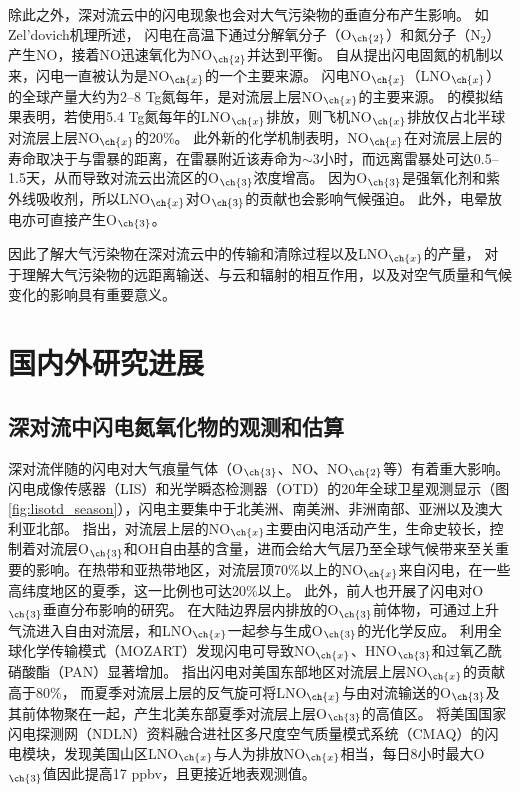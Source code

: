 除此之外，深对流云中的闪电现象也会对大气污染物的垂直分布产生影响。
如Zel'dovich机理所述\citep{Zeldovich.1967}，
闪电在高温下通过分解氧分子（O$_{\ch{2}}$）和氮分子（N$_2$）产生NO，接着NO迅速氧化为NO$_{\ch{2}}$并达到平衡。
自从\citet{Liebig.1827}提出闪电固氮的机制以来，闪电一直被认为是NO$_{\ch{x}}$的一个主要来源\citep{Hutchinson.1954}。
闪电NO$_{\ch{x}}$（LNO$_{\ch{x}}$）的全球产量大约为2–8 Tg氮每年，是对流层上层NO$_{\ch{x}}$的主要来源\citep{Galloway.2004,Schumann.2007}。
\citet{Grewe.2002}的模拟结果表明，若使用5.4 Tg氮每年的LNO$_{\ch{x}}$排放，则飞机NO$_{\ch{x}}$排放仅占北半球对流层上层NO$_{\ch{x}}$的20\%。
此外新的化学机制表明，NO$_{\ch{x}}$在对流层上层的寿命取决于与雷暴的距离，在雷暴附近该寿命为$\sim$3小时，而远离雷暴处可达0.5--1.5天\citep{Nault.2016,Nault.2017}，从而导致对流云出流区的O$_{\ch{3}}$浓度增高\citep{Pickering.1996,Hauglustaine.2001,DeCaria.2005}。
因为O$_{\ch{3}}$是强氧化剂和紫外线吸收剂\citep{Myhre.2013}，所以LNO$_{\ch{x}}$对O$_{\ch{3}}$的贡献也会影响气候强迫。
此外，电晕放电亦可直接产生O$_{\ch{3}}$\citep{Minschwaner.2008,Kotsakis.2017}。

因此了解大气污染物在深对流云中的传输和清除过程以及LNO$_{\ch{x}}$的产量，
对于理解大气污染物的远距离输送、与云和辐射的相互作用，以及对空气质量和气候变化的影响具有重要意义。



\section{国内外研究进展}

\subsection{深对流中闪电氮氧化物的观测和估算} \label{sec:intro_lnox}

深对流伴随的闪电对大气痕量气体（O$_{\ch{3}}$、NO、NO$_{\ch{2}}$等）有着重大影响\citep{DeCaria.2005,Schumann.2007,Ott.2010,Banerjee.2014}。
闪电成像传感器（LIS）和光学瞬态检测器（OTD）的20年全球卫星观测显示（图\ref{fig:lisotd_season}），闪电主要集中于北美洲、南美洲、非洲南部、亚洲以及澳大利亚北部。
\citet{Levy.1996}指出，对流层上层的NO$_{\ch{x}}$主要由闪电活动产生，生命史较长，控制着对流层O$_{\ch{3}}$和OH自由基的含量，进而会给大气层乃至全球气候带来至关重要的影响。在热带和亚热带地区，对流层顶70\%以上的NO$_{\ch{x}}$来自闪电，在一些高纬度地区的夏季，这一比例也可达20\%以上\citep{Jourdain.2001,Martin.2002}。
此外，前人也开展了闪电对O$_{\ch{3}}$垂直分布影响的研究。
在大陆边界层内排放的O$_{\ch{3}}$前体物，可通过上升气流进入自由对流层，和LNO$_{\ch{x}}$一起参与生成O$_{\ch{3}}$的光化学反应\citep{Bond.2002}。
\citet{Tie.2001}利用全球化学传输模式（MOZART）发现闪电可导致NO$_{\ch{x}}$、HNO$_{\ch{3}}$和过氧乙酰硝酸酯（PAN）显著增加。
\citet{Cooper.2009}指出闪电对美国东部地区对流层上层NO$_{\ch{x}}$的贡献高于80\%，
而夏季对流层上层的反气旋可将LNO$_{\ch{x}}$与由对流输送的O$_{\ch{3}}$及其前体物聚在一起，产生北美东部夏季对流层上层O$_{\ch{3}}$的高值区。
\citet{Kang.2020}将美国国家闪电探测网（NDLN）资料融合进社区多尺度空气质量模式系统（CMAQ）的闪电模块，发现美国山区LNO$_{\ch{x}}$与人为排放NO$_{\ch{x}}$相当，每日8小时最大O$_{\ch{3}}$值因此提高17 ppbv，且更接近地表观测值。

